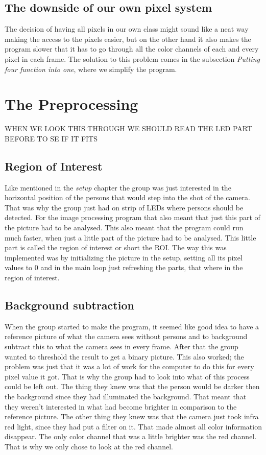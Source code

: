 \subsection{The downside of our own pixel system}

The decision of having all pixels in our own class might sound like a neat way making the access to the pixels easier, but on the other hand it also makes the program slower that it has to go through all the color channels of each and every pixel in each frame. The solution to this problem comes in the subsection \textit{Putting four function into one}, where we simplify the program. 

\section{The Preprocessing}
WHEN WE LOOK THIS THROUGH WE SHOULD READ THE LED PART BEFORE TO SE IF IT FITS
\subsection{Region of Interest}
Like mentioned in the \textit{setup} chapter the group was just interested in the horizontal position of the persons that would step into the shot of the camera. That was why the group just had on strip of LEDs where persons should be detected. For the image processing program that also meant that just this part of the picture had to be analysed. This also meant that the program could run much faster, when just a little part of the picture had to be analysed. This little part is called the region of interest or short the ROI. 
The way this was implemented was by initializing the picture in the setup, setting all its pixel values to 0 and in the main loop just refreshing the parts, that where in the region of interest. 
\subsection{Background subtraction}
When the group started to make the program, it seemed like good idea to have a reference picture of what the camera sees without persons and to background subtract this to what the camera sees in every frame. After that the group wanted to threshold the result to get a binary picture. 
This also worked; the problem was just that it was a lot of work for the computer to do this for every pixel value it got. That is why the group had to look into what of this process could be left out. 
The thing they knew was that the person would be darker then the background since they had illuminated the background. That meant that they weren't interested in what had become brighter in comparison to the reference picture. The other thing they knew was that the camera just took infra red light, since they had put a filter on it. That made almost all color information disappear. The only color channel that was a little brighter was the red channel. That is why we only chose to look at the red channel. 

